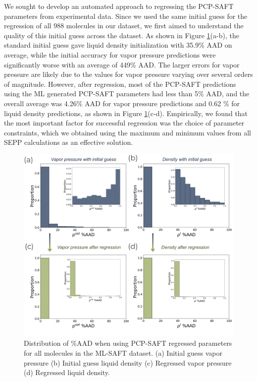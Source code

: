 We sought to develop an automated approach to regressing the PCP-SAFT parameters from experimental data. Since we used the same initial guess for the regression of all 988 molecules in our dataset, we first aimed to understand the quality of this initial guess across the dataset. As shown in Figure \ref{fig:regression_errors}(a-b), the standard initial guess gave liquid density initialization with 35.9\% AAD on average, while the initial accuracy for vapor pressure predictions were significantly worse with an average of 449\% AAD. The larger errors for vapor pressure are likely due to the values for vapor pressure varying over several orders of magnitude. However, after regression, most of the PCP-SAFT predictions using the ML generated PCP-SAFT parameters had less than 5\% AAD, and the overall average was 4.26\% AAD for vapor pressure predictions and 0.62 \% for liquid density predictions, as shown in Figure \ref{fig:regression_errors}(c-d). Empirically, we found that the most important factor for successful regression was the choice of parameter constraints, which we obtained using the maximum and minimum values from all SEPP calculations as an effective solution. 

\begin{figure}
    \centering
    \includegraphics[width=\textwidth]{gfx/Chapter07/regression_errors.png}
    \caption{Distribution of \%AAD  when using PCP-SAFT regressed parameters for all molecules in the ML-SAFT dataset. (a) Initial guess vapor pressure (b) Initial guess liquid density (c) Regressed vapor pressure (d) Regressed liquid density.}
    \label{fig:regression_errors}
\end{figure}

